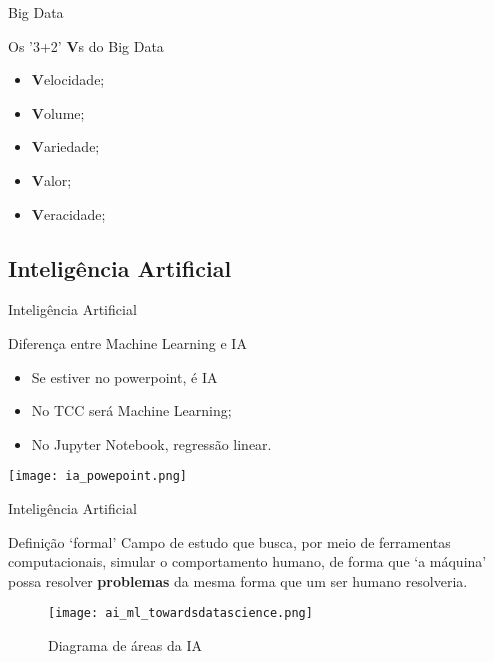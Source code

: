 \documentclass[aspectratio=169]{beamer}
\begin{document}
\begin{frame}{Big Data}
    \centering
    \begin{block}{}
        Os '3+2' \textbf{V}s do Big Data
    \end{block}
    \begin{itemize}
        \item \textbf{V}elocidade;
        \item \textbf{V}olume;
        \item \textbf{V}ariedade;
        \item \alert{\textbf{V}alor};
        \item \alert{\textbf{V}eracidade};
    \end{itemize}
\end{frame}


\subsection{Inteligência Artificial}
\begin{frame}{Inteligência Artificial}
    \centering
    \begin{block}{Diferença entre Machine Learning e IA}
        \begin{itemize}
            \item Se estiver no powerpoint, é IA
            \item No TCC será Machine Learning;
            \item No Jupyter Notebook, regressão linear.
        \end{itemize}
    \end{block}
    \texttt{[image: ia\_powepoint.png]}
\end{frame}

\begin{frame}{Inteligência Artificial}
    \centering
    \begin{block}{Definição `formal'}
        Campo de estudo que busca, por meio de ferramentas computacionais, simular
        o comportamento humano, de forma que `a máquina' possa resolver \textbf{problemas}
        da mesma forma que um ser humano resolveria.
    \end{block}
    \begin{figure}
        \texttt{[image: ai\_ml\_towardsdatascience.png]}
        \caption{\cite{Wu2019} Diagrama de áreas da IA}
    \end{figure}
\end{frame}
\end{document}
